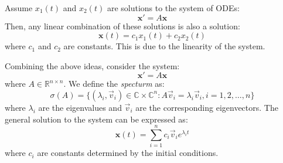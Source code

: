 \documentclass[11pt]{article}
\begin{document}
\begin{example}[Superposition]

    Assume $x_1(t)$ and $x_2(t)$ are solutions to the system of ODEs:
    $$\textbf{x}' = A\textbf{x}$$
    Then, any linear combination of these solutions is also a solution:
    $$\textbf{x}(t) = c_1 x_1(t) + c_2 x_2(t)$$
    where \( c_1 \) and \( c_2 \) are constants. This is due to the linearity of the system.
\end{example}

\begin{definition}
    Combining the above ideas, consider the system:
    $$\textbf{x}' = A\textbf{x}$$
    where \( A \in \mathbb{R}^{n \times n} \). We define the \textit{specturm} as:
    \begin{equation}
    \sigma(A) = \{(\lambda_i, \vec{v}_i) \in \mathbb{C} \times \mathbb{C}^n : A\vec{v}_i = \lambda_i \vec{v}_i, i = 1, 2, \ldots, n\}
    \end{equation}
    where \( \lambda_i \) are the eigenvalues and \( \vec{v}_i \) are the corresponding eigenvectors. The general solution to the system can be expressed as:
    \begin{equation}
            \textbf{x}(t) = \sum_{i=1}^{n} c_i \vec{v}_i e^{\lambda_i t}
    \end{equation}
    where \( c_i \) are constants determined by the initial conditions.
\end{definition}
\end{document}
